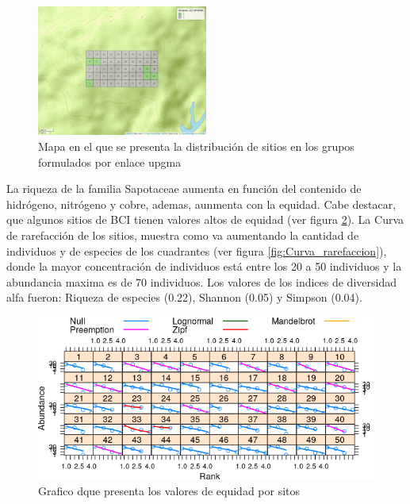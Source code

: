 \documentclass[11pt,]{article}
\begin{document}
\begin{figure}
\centering
\includegraphics[width=0.50000\textwidth]{mapa_upgma_k2.png}
\caption{Mapa en el que se presenta la distribución de sitios en los
grupos formulados por enlace upgma\label{fig:mapa_upgma_k2}}
\end{figure}

La riqueza de la familia Sapotaceae aumenta en función del contenido de
hidrógeno, nitrógeno y cobre, ademas, aunmenta con la equidad. Cabe
destacar, que algunos sitios de BCI tienen valores altos de equidad (ver
figura \ref{fig:grafico_niveles_equidad}). La Curva de rarefacción de
los sitios, muestra como va aumentando la cantidad de individuos y de
especies de los cuadrantes (ver figura \ref{fig:Curva_rarefaccion}),
donde la mayor concentración de individuos está entre los 20 a 50
individuos y la abundancia maxima es de 70 individuos. Los valores de
los indices de diversidad alfa fueron: Riqueza de especies (0.22),
Shannon (0.05) y Simpson (0.04).

\begin{figure}
\centering
\includegraphics{grafico_niveles_equidad.png}
\caption{Grafico dque presenta los valores de equidad por sitos
\label{fig:grafico_niveles_equidad}}
\end{figure}
\end{document}
